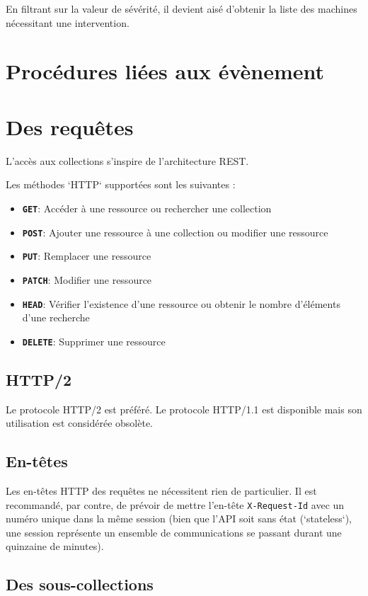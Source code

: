 \documentclass[a4paper,twoside]{article}
\newcommand{\verbe}[1]{\texttt{\textbf{#1}}}
\begin{document}
En filtrant sur la valeur de sévérité, il devient aisé d'obtenir la liste des machines nécessitant une intervention.

\section{Procédures liées aux évènement}

\section{Des requêtes}

L'accès aux collections s'inspire de l'architecture REST.

Les méthodes `HTTP` supportées sont les suivantes :

\begin{itemize}
  \item \verbe{GET}: Accéder à une ressource ou rechercher une collection
  \item \verbe{POST}: Ajouter une ressource à une collection ou modifier une ressource
  \item \verbe{PUT}: Remplacer une ressource
  \item \verbe{PATCH}: Modifier une ressource
  \item \verbe{HEAD}: Vérifier l'existence d'une ressource ou obtenir le nombre d'éléments d'une recherche
  \item \verbe{DELETE}: Supprimer une ressource
\end{itemize}
    
\subsection{HTTP/2}

Le protocole HTTP/2 est préféré. Le protocole HTTP/1.1 est disponible mais son utilisation est considérée obsolète.

\subsection{En-têtes}

Les en-têtes HTTP des requêtes ne nécessitent rien de particulier. Il est recommandé, par contre, de prévoir de mettre l'en-tête \texttt{X-Request-Id} avec un numéro unique dans la même session (bien que l'API soit sans état (`stateless`), une session représente un ensemble de communications se passant durant une quinzaine de minutes).

\subsection{Des sous-collections}
\end{document}
